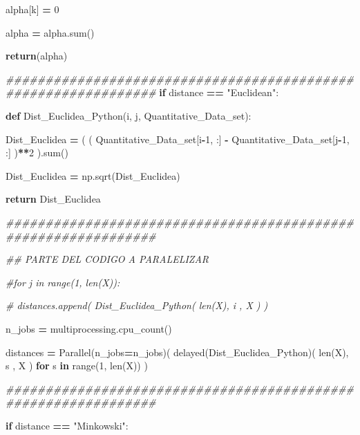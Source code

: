 \documentclass[
  11pt,
  a4paper,
]{article}
\newenvironment{Shaded}{\begin{snugshade}}{\end{snugshade}}
\newcommand{\BuiltInTok}[1]{#1}
\newcommand{\CommentTok}[1]{\textcolor[rgb]{0.56,0.35,0.01}{\textit{#1}}}
\newcommand{\ControlFlowTok}[1]{\textcolor[rgb]{0.13,0.29,0.53}{\textbf{#1}}}
\newcommand{\DecValTok}[1]{\textcolor[rgb]{0.00,0.00,0.81}{#1}}
\newcommand{\KeywordTok}[1]{\textcolor[rgb]{0.13,0.29,0.53}{\textbf{#1}}}
\newcommand{\NormalTok}[1]{#1}
\newcommand{\OperatorTok}[1]{\textcolor[rgb]{0.81,0.36,0.00}{\textbf{#1}}}
\newcommand{\StringTok}[1]{\textcolor[rgb]{0.31,0.60,0.02}{#1}}
\begin{document}
\begin{Shaded}
\begin{Highlighting}[]
\NormalTok{                alpha[k] }\OperatorTok{=} \DecValTok{0}

\NormalTok{        alpha }\OperatorTok{=}\NormalTok{ alpha.}\BuiltInTok{sum}\NormalTok{()}

        \ControlFlowTok{return}\NormalTok{(alpha)}

\CommentTok{\#\#\#\#\#\#\#\#\#\#\#\#\#\#\#\#\#\#\#\#\#\#\#\#\#\#\#\#\#\#\#\#\#\#\#\#\#\#\#\#\#\#\#\#\#\#\#\#\#\#\#\#\#\#\#\#\#\#\#\#\#\#\#    }
    \ControlFlowTok{if}\NormalTok{ distance }\OperatorTok{==} \StringTok{"Euclidean"}\NormalTok{:}

        \KeywordTok{def}\NormalTok{ Dist\_Euclidea\_Python(i, j, Quantitative\_Data\_set): }

\NormalTok{            Dist\_Euclidea }\OperatorTok{=}\NormalTok{ ( ( Quantitative\_Data\_set[i}\OperatorTok{{-}}\DecValTok{1}\NormalTok{, :] }\OperatorTok{{-}}\NormalTok{ Quantitative\_Data\_set[j}\OperatorTok{{-}}\DecValTok{1}\NormalTok{, :] )}\OperatorTok{**}\DecValTok{2}\NormalTok{ ).}\BuiltInTok{sum}\NormalTok{()}

\NormalTok{            Dist\_Euclidea }\OperatorTok{=}\NormalTok{ np.sqrt(Dist\_Euclidea)}

            \ControlFlowTok{return}\NormalTok{ Dist\_Euclidea}

\CommentTok{\#\#\#\#\#\#\#\#\#\#\#\#\#\#\#\#\#\#\#\#\#\#\#\#\#\#\#\#\#\#\#\#\#\#\#\#\#\#\#\#\#\#\#\#\#\#\#\#\#\#\#\#\#\#\#\#\#\#\#\#\#\#\#}
           
        \CommentTok{\#\# PARTE DEL CODIGO A PARALELIZAR}

        \CommentTok{\#for j in range(1, len(X)):}

          \CommentTok{\# distances.append( Dist\_Euclidea\_Python( len(X), i , X ) )}

\NormalTok{        n\_jobs  }\OperatorTok{=}\NormalTok{ multiprocessing.cpu\_count()}

\NormalTok{        distances }\OperatorTok{=}\NormalTok{ Parallel(n\_jobs}\OperatorTok{=}\NormalTok{n\_jobs)( delayed(Dist\_Euclidea\_Python)( }\BuiltInTok{len}\NormalTok{(X), s , X ) }\ControlFlowTok{for}\NormalTok{ s }\KeywordTok{in} \BuiltInTok{range}\NormalTok{(}\DecValTok{1}\NormalTok{, }\BuiltInTok{len}\NormalTok{(X)) )}
           

\CommentTok{\#\#\#\#\#\#\#\#\#\#\#\#\#\#\#\#\#\#\#\#\#\#\#\#\#\#\#\#\#\#\#\#\#\#\#\#\#\#\#\#\#\#\#\#\#\#\#\#\#\#\#\#\#\#\#\#\#\#\#\#\#\#\#}

    \ControlFlowTok{if}\NormalTok{ distance }\OperatorTok{==} \StringTok{"Minkowski"}\NormalTok{:}


\end{Highlighting}
\end{Shaded}
\end{document}
